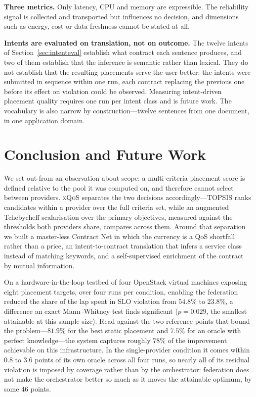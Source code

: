 \documentclass[conference]{IEEEtran}
\begin{document}
\textbf{Three metrics.} Only latency, CPU and memory are expressible. The
reliability signal is collected and transported but influences no decision,
and dimensions such as energy, cost or data freshness cannot be stated at
all.

\textbf{Intents are evaluated on translation, not on outcome.} The twelve
intents of Section~\ref{sec:intenteval} establish what contract each sentence
produces, and two of them establish that the inference is semantic rather
than lexical. They do not establish that the resulting placements serve the
user better: the intents were submitted in sequence within one run, each
contract replacing the previous one before its effect on violation could be
observed. Measuring intent-driven placement quality requires one run per
intent class and is future work. The vocabulary is also narrow by
construction---twelve sentences from one document, in one application
domain.

\section{Conclusion and Future Work}
\label{sec:conclusion}

We set out from an observation about scope: a multi-criteria placement score
is defined relative to the pool it was computed on, and therefore cannot
select between providers. \textsc{xQoS} separates the two decisions
accordingly---TOPSIS ranks candidates within a provider over the full
criteria set, while an augmented Tchebycheff scalarisation over the primary
objectives, measured against the thresholds both providers share, compares
across them. Around that separation we built a master-less Contract Net in
which the currency is a QoS shortfall rather than a price, an
intent-to-contract translation that infers a service class instead of
matching keywords, and a self-supervised enrichment of the contract by mutual
information.

On a hardware-in-the-loop testbed of four OpenStack virtual machines exposing
eight placement targets, over four runs per condition, enabling the
federation reduced the share of the lap spent in SLO violation from $54.8\%$
to $23.8\%$, a difference an exact Mann--Whitney test finds significant
($p=0.029$, the smallest attainable at this sample size). Read against the
two reference points that bound the problem---$81.9\%$ for the best static
placement and $7.5\%$ for an oracle with perfect knowledge---the system
captures roughly $78\%$ of the improvement achievable on this infrastructure.
In the single-provider condition it comes within $0.8$ to $3.6$ points of its
own oracle across all four runs, so nearly all of its residual violation is
imposed by coverage rather than by the orchestrator: federation does not make
the orchestrator better so much as it moves the attainable optimum, by some
$46$ points.
\end{document}
